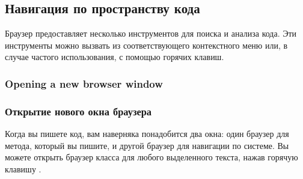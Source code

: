 \documentclass[a4paper,10pt,twoside]{book}
\begin{document}
\subsection{Навигация по пространству кода}


Браузер предоставляет несколько инструментов для поиска и анализа кода. Эти инструменты можно вызвать из соответствующего контекстного меню или, в случае частого использования, с помощью горячих клавиш.

\subsubsection{Opening a new browser window}
\subsubsection{Открытие нового окна браузера}


Когда вы пишете код, вам наверняка понадобится два окна: один браузер для метода, который вы пишите, и другой браузер для навигации по системе. Вы можете открыть браузер класса для любого выделенного текста, нажав горячую клавишу  .


\end{document}
